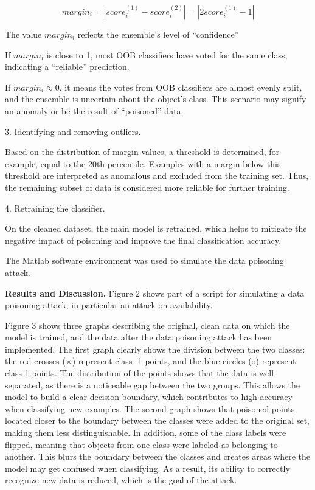\begin{multicols}{2}
\[margin_{i} = \left| score_{i}^{(1)} - score_{i}^{(2)} \right| = \left| 2score_{i}^{(1)} - 1 \right|\]

The value \(margin_{i}\) reflects the ensemble's level of ``confidence''

If \(margin_{i}\) is close to 1, most OOB classifiers have voted for the
same class, indicating a ``reliable'' prediction.

If \(margin_{i} \approx 0\), it means the votes from OOB classifiers are
almost evenly split, and the ensemble is uncertain about the object's
class. This scenario may signify an anomaly or be the result of
``poisoned'' data.

3. Identifying and removing outliers.

Based on the distribution of margin values, a threshold is determined,
for example, equal to the 20th percentile. Examples with a margin below
this threshold are interpreted as anomalous and excluded from the
training set. Thus, the remaining subset of data is considered more
reliable for further training.

4. Retraining the classifier.

On the cleaned dataset, the main model is retrained, which helps to
mitigate the negative impact of poisoning and improve the final
classification accuracy.

The Matlab software environment was used to simulate the data poisoning
attack.

{\bfseries Results and Discussion.} Figure 2 shows part of a script for
simulating a data poisoning attack, in particular an attack on
availability.

Figure 3 shows three graphs describing the original, clean data on which
the model is trained, and the data after the data poisoning attack has
been implemented. The first graph clearly shows the division between the
two classes: the red crosses (×) represent class -1 points, and the blue
circles (o) represent class 1 points. The distribution of the points
shows that the data is well separated, as there is a noticeable gap
between the two groups. This allows the model to build a clear decision
boundary, which contributes to high accuracy when classifying new
examples. The second graph shows that poisoned points located closer to
the boundary between the classes were added to the original set, making
them less distinguishable. In addition, some of the class labels were
flipped, meaning that objects from one class were labeled as belonging
to another. This blurs the boundary between the classes and creates
areas where the model may get confused when classifying. As a result,
its ability to correctly recognize new data is reduced, which is the
goal of the attack.
\end{multicols}


